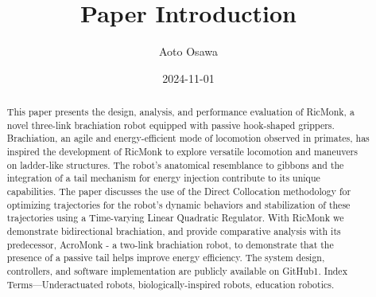 \documentclass{article}
\begin{document}
\title{Paper Introduction}
\author{Aoto Osawa}
\date{2024-11-01}
\maketitle

\begin{abstract}
This paper presents the design, analysis, and performance evaluation of RicMonk, a novel three-link brachiation robot equipped with passive hook-shaped grippers. Brachiation, an agile and energy-efficient mode of locomotion observed in primates, has inspired the development of RicMonk to explore versatile locomotion and maneuvers on ladder-like structures. The robot’s anatomical resemblance to gibbons and the integration of a tail mechanism for energy injection contribute to its unique capabilities. The paper discusses the use of the Direct Collocation methodology for optimizing trajectories for the robot’s dynamic behaviors and stabilization of these trajectories using a Time-varying Linear Quadratic Regulator. With RicMonk we demonstrate bidirectional brachiation, and provide comparative analysis with its predecessor, AcroMonk - a two-link brachiation robot, to demonstrate that the presence of a passive tail helps improve energy efficiency. The system design, controllers, and software implementation are publicly available on GitHub1. Index Terms—Underactuated robots, biologically-inspired robots, education robotics.\cite{grama2024ricmonk}
\end{abstract}



\end{document}
